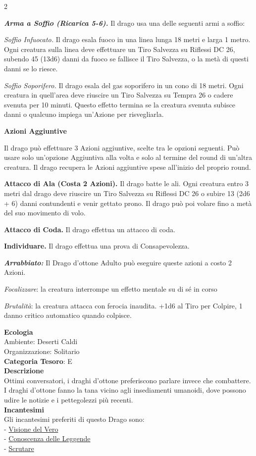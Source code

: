 \begin{multicols}{2}
{\emph{\textbf{Arma a Soffio (Ricarica 5-6).}} Il drago usa una delle seguenti armi a soffio:

\emph{Soffio Infuocato.} Il drago esala fuoco in una linea lunga 18 metri e larga 1 metro. Ogni creatura sulla linea deve effettuare un Tiro Salvezza su Riflessi DC 26, subendo 45 (13d6) danni da fuoco se fallisce il Tiro Salvezza, o la metà di questi danni se lo riesce.

\emph{Soffio Soporifero.} Il drago esala del gas soporifero in un cono di 18 metri. Ogni creatura in quell'area deve riuscire un Tiro Salvezza su Tempra 26 o cadere svenuta per 10 minuti. Questo effetto termina se la creatura svenuta subisce danni o qualcuno impiega un'Azione per risvegliarla.

\textbf{Azioni Aggiuntive}

Il drago può effettuare 3 Azioni aggiuntive, scelte tra le opzioni seguenti. Può usare solo un'opzione Aggiuntiva alla volta e solo al termine del round di un'altra creatura. Il drago recupera le Azioni aggiuntive spese all'inizio del proprio round.

\textbf{Attacco di Ala (Costa 2 Azioni).} Il drago batte le ali. Ogni creatura entro 3 metri dal drago deve riuscire un Tiro Salvezza su Riflessi DC 26 o subire 13 (2d6 + 6) danni contundenti e venir gettato prono. Il drago può poi volare fino a metà del suo movimento di volo.

\textbf{Attacco di Coda.} Il drago effettua un attacco di coda.

\textbf{Individuare.} Il drago effettua una prova di Consapevolezza.

\emph{\textbf{Arrabbiato:}} Il Drago d'ottone Adulto può eseguire queste azioni a costo 2 Azioni.

\emph{Focalizzare}: la creatura interrompe un effetto mentale su di sé in corso

\emph{Brutalità}: la creatura attacca con ferocia inaudita. +1d6 al Tiro per Colpire, 1 danno critico automatico quando colpisce.

\textbf{Ecologia}\\
Ambiente: Deserti Caldi\\
Organizzazione: Solitario\\
\textbf{Categoria Tesoro}: E\\
\textbf{Descrizione}\\
Ottimi conversatori, i draghi d'ottone preferiscono parlare invece che combattere. I draghi d'ottone fanno la tana vicino agli insediamenti umanoidi, dove possono udire le notizie e i pettegolezzi più recenti.\\
\textbf{Incantesimi}\\
Gli incantesimi preferiti di questo Drago sono:\\
- \hyperlink{Visione del Vero}{Visione del Vero}\\
- \hyperlink{Conoscenza delle Leggende}{Conoscenza delle Leggende}\\
- \hyperlink{Scrutare}{Scrutare}

}
\end{multicols}
